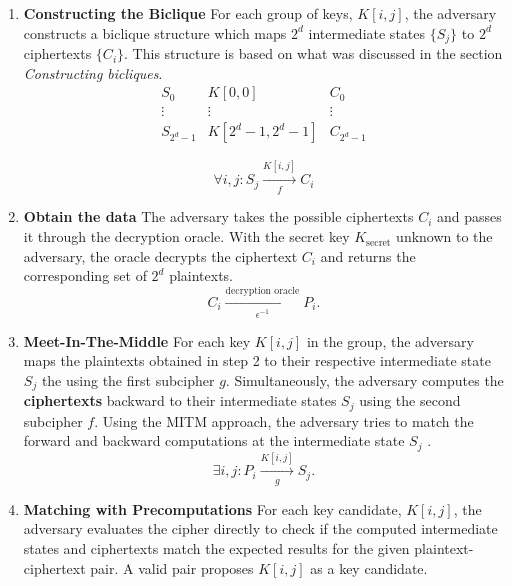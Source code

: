 \documentclass{rapport}
\begin{document}
 \begin{enumerate}[start = 1, label={(\bfseries Step\arabic*):}]
    \item \textbf{Constructing the Biclique} For each group of keys, \( K[i, j] \), the adversary constructs a biclique structure which maps \( 2^d \) intermediate states \( \{S_j\} \) to \( 2^d \) ciphertexts \( \{C_i\} \). This structure is based on what was discussed in the section \textit{Constructing bicliques}.
            \begin{equation}
                \begin{array}{ccc}
                    S_0 & K[0,0] & C_0 \\
                    \vdots & \vdots & \vdots \\
                    S_{2^d-1} & K[2^d-1,2^d-1] & C_{2^d-1}
                    \end{array}
            \end{equation}
                
            \begin{equation}
                \forall i, j : S_j \xrightarrow[\quad f \quad]{K[i, j]} C_i
            \end{equation}

    \item \textbf{Obtain the data} The adversary takes the possible ciphertexts $C_i$ and passes it through the decryption oracle. With the secret key $K_{\text{secret}}$ unknown to the adversary, the oracle decrypts the ciphertext $C_i$ and returns the corresponding set of $2^d$ plaintexts.
            \begin{equation}
                C_i \xrightarrow[\epsilon^{-1}]{\text{decryption oracle}} P_i.
            \end{equation}
    \item \textbf{Meet-In-The-Middle} For each key $K[i, j]$ in the group, the adversary maps the plaintexts obtained in step 2 to their respective intermediate state $S_j$ the using the first subcipher $g$. Simultaneously, the adversary computes the \textbf{ciphertexts} backward to their intermediate states $S_j$ using the second subcipher $f$. Using the MITM approach, the adversary tries to match the forward and backward computations at the intermediate state $S_j$ .
            \begin{equation}
                \exists i, j : P_i \xrightarrow[g]{K[i, j]} S_j.
            \end{equation}
    \item \textbf{Matching with Precomputations} For each key candidate, $K[i, j]$, the adversary evaluates the cipher directly to check if the computed intermediate states and ciphertexts match the expected results for the given plaintext-ciphertext pair. A valid pair proposes $K[i, j]$ as a key candidate.


 \end{enumerate}
\end{document}
